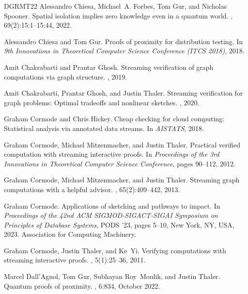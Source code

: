 \documentclass[10pt,a4paper]{article}
\theoremstyle{definition}
\begin{document}
\begin{thebibliography}{DGRMT22}
Alessandro Chiesa, Michael~A. Forbes, Tom Gur, and Nicholas Spooner.
\newblock Spatial isolation implies zero knowledge even in a quantum world.
, 69(2):15:1--15:44, 2022.

Alessandro Chiesa and Tom Gur.
\newblock Proofs of proximity for distribution testing.
\newblock In {\em 9th Innovations in Theoretical Computer Science Conference ({{ITCS}} 2018)}, 2018.

Amit Chakrabarti and Prantar Ghosh.
\newblock Streaming verification of graph computations via graph structure.
, 2019.

Amit Chakrabarti, Prantar Ghosh, and Justin Thaler.
\newblock Streaming verification for graph problems: {{Optimal}} tradeoffs and nonlinear sketches.
, 2020.

Graham Cormode and Chris Hickey.
\newblock Cheap checking for cloud computing: {{Statistical}} analysis via annotated data streams.
\newblock In {\em {{AISTATS}}}, 2018.

Graham Cormode, Michael Mitzenmacher, and Justin Thaler.
\newblock Practical verified computation with streaming interactive proofs.
\newblock In {\em Proceedings of the 3rd Innovations in Theoretical Computer Science Conference}, pages 90--112, 2012.

Graham Cormode, Michael Mitzenmacher, and Justin Thaler.
\newblock Streaming graph computations with a helpful advisor.
, 65(2):409--442, 2013.

Graham Cormode.
\newblock Applications of sketching and pathways to impact.
\newblock In {\em Proceedings of the 42nd {{ACM SIGMOD-SIGACT-SIGAI}} Symposium on Principles of Database Systems}, {{PODS}} '23, pages 5--10, {New York, NY, USA}, 2023. {Association for Computing Machinery}.

Graham Cormode, Justin Thaler, and Ke~Yi.
\newblock Verifying computations with streaming interactive proofs.
, 5(1):25--36, 2011.

Marcel Dall'Agnol, Tom Gur, Subhayan Roy~Moulik, and Justin Thaler.
\newblock Quantum proofs of proximity.
, 6:834, October 2022.


\end{thebibliography}
\end{document}
